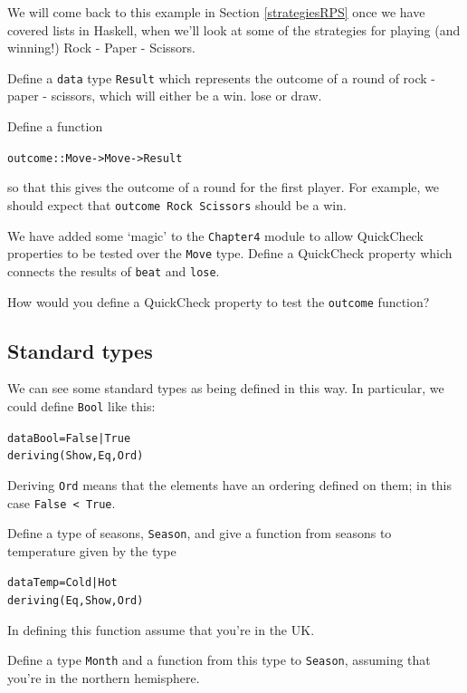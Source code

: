We will come back to this example in Section \ref{strategiesRPS} once we have covered lists in Haskell, when we'll 
look at some of the strategies for playing (and winning!) Rock - Paper - Scissors.


\begin{exercises}

\item
Define a \texttt{data} type \texttt{Result} which represents the outcome of a round of rock - paper - scissors, which will either be a win. lose or draw.

\item
Define a function
\begin{alltt}
outcome :: Move -> Move -> Result
\end{alltt}
so that this gives the outcome of a round for the first player. For example, we should expect that \texttt{outcome Rock Scissors} should be a win.

\item
We have added some `magic' to the \texttt{Chapter4} module to allow QuickCheck properties to be tested over the \texttt{Move} type. Define a QuickCheck property which connects the results of \texttt{beat} and \texttt{lose}.

\item
How would you define a QuickCheck property to test the \texttt{outcome} function?

\end{exercises}

\subsection*{Standard types}

We can see some standard types as being defined in this way. In particular, we could define \texttt{Bool} like this:
\begin{alltt}
data Bool = False | True
            deriving (Show, Eq, Ord)
\end{alltt}
Deriving \texttt{Ord} means that the elements have an ordering defined on them; in this case \texttt{False < True}.

\begin{exercises}

\item
Define a type of seasons, \texttt{Season}, and give a function from seasons to temperature given by the type
\begin{alltt}
data Temp = Cold | Hot
            deriving (Eq, Show, Ord)
\end{alltt}
In defining this function assume that you're in the UK.

\item
Define a type \texttt{Month} and a function from this type to \texttt{Season}, assuming that you're in the northern hemisphere.

\end{exercises}

